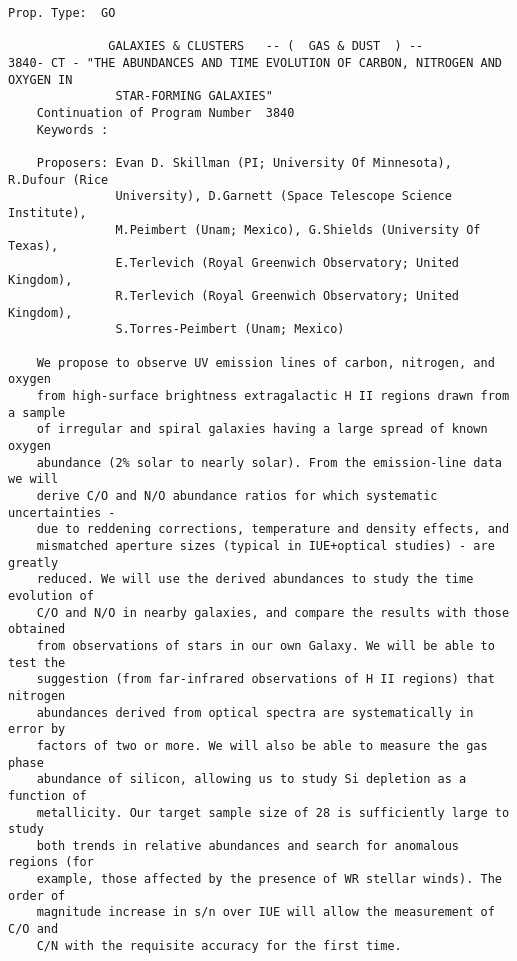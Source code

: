 \begin{footnotesize}
\begin{footnotesize}
\begin{verbatim}
Prop. Type:  GO                                                                
 
              GALAXIES & CLUSTERS   -- (  GAS & DUST  ) -- 
3840- CT - "THE ABUNDANCES AND TIME EVOLUTION OF CARBON, NITROGEN AND OXYGEN IN
               STAR-FORMING GALAXIES"          
    Continuation of Program Number  3840       
    Keywords :  
 
    Proposers: Evan D. Skillman (PI; University Of Minnesota), R.Dufour (Rice 
               University), D.Garnett (Space Telescope Science Institute), 
               M.Peimbert (Unam; Mexico), G.Shields (University Of Texas), 
               E.Terlevich (Royal Greenwich Observatory; United Kingdom), 
               R.Terlevich (Royal Greenwich Observatory; United Kingdom), 
               S.Torres-Peimbert (Unam; Mexico)   
 
    We propose to observe UV emission lines of carbon, nitrogen, and oxygen 
    from high-surface brightness extragalactic H II regions drawn from a sample
    of irregular and spiral galaxies having a large spread of known oxygen  
    abundance (2% solar to nearly solar). From the emission-line data we will 
    derive C/O and N/O abundance ratios for which systematic uncertainties -
    due to reddening corrections, temperature and density effects, and     
    mismatched aperture sizes (typical in IUE+optical studies) - are greatly 
    reduced. We will use the derived abundances to study the time evolution of
    C/O and N/O in nearby galaxies, and compare the results with those obtained
    from observations of stars in our own Galaxy. We will be able to test the 
    suggestion (from far-infrared observations of H II regions) that nitrogen 
    abundances derived from optical spectra are systematically in error by
    factors of two or more. We will also be able to measure the gas phase 
    abundance of silicon, allowing us to study Si depletion as a function of 
    metallicity. Our target sample size of 28 is sufficiently large to study 
    both trends in relative abundances and search for anomalous regions (for
    example, those affected by the presence of WR stellar winds). The order of
    magnitude increase in s/n over IUE will allow the measurement of C/O and
    C/N with the requisite accuracy for the first time.      
                                                                      
\end{verbatim}
\end{footnotesize}
\end{footnotesize}

